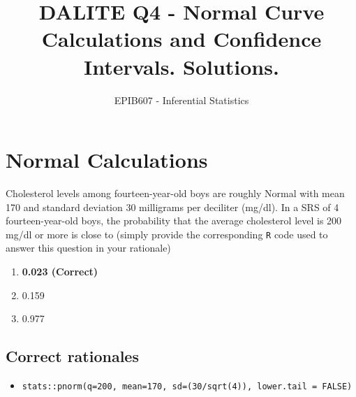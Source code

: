 \documentclass[letterpaper,12pt,twoside,printwatermark=false]{pinp}
\title{DALITE Q4 - Normal Curve Calculations and Confidence Intervals.
Solutions.}
\author[a]{EPIB607 - Inferential Statistics}
\affil[a]{Fall 2019, McGill University}
\providecommand{\tightlist}{%
  \setlength{\itemsep}{0pt}\setlength{\parskip}{0pt}}
\begin{document}
\verticaladjustment{-2pt}

\maketitle
\thispagestyle{firststyle}



\hypertarget{normal-calculations}{%
\section{Normal Calculations}\label{normal-calculations}}

Cholesterol levels among fourteen-year-old boys are roughly Normal with
mean 170 and standard deviation 30 milligrams per deciliter (mg/dl). In
a SRS of 4 fourteen-year-old boys, the probability that the average
cholesterol level is 200 mg/dl or more is close to (simply provide the
corresponding \texttt{R} code used to answer this question in your
rationale)

\begin{enumerate}
\def\labelenumi{\alph{enumi}.}
\tightlist
\item
  \textbf{0.023 (Correct)}
\item
  0.159
\item
  0.977
\end{enumerate}

\hypertarget{correct-rationales}{%
\subsection{Correct rationales}\label{correct-rationales}}

\begin{itemize}
\tightlist
\item
  \texttt{stats::pnorm(q=200,\ mean=170,\ sd=(30/sqrt(4)),\ lower.tail\ =\ FALSE)}
\end{itemize}
\end{document}
